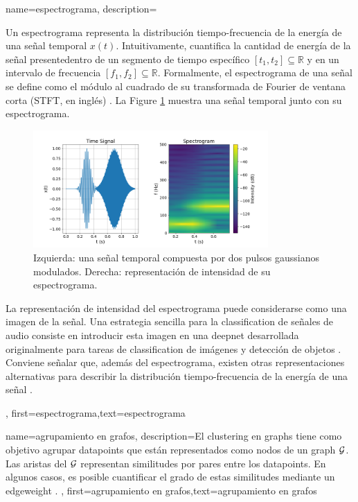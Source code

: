 {{
{name={espectrograma},
	description={
		Un espectrograma representa la distribución tiempo-frecuencia de la energía de una señal temporal $x(t)$.  
		Intuitivamente, cuantifica la cantidad de energía de la señal presentedentro de un segmento de tiempo específico 
		$[t_{1},t_{2}] \subseteq \mathbb{R}$ y en un intervalo de frecuencia $[f_{1},f_{2}]\subseteq \mathbb{R}$. 
		Formalmente, el espectrograma de una señal se define como el módulo al cuadrado de su transformada
		de Fourier de ventana corta (STFT, en inglés) \cite{cohen1995time}.
        La Figure \ref{fig:spectrogram_dict} muestra una señal temporal junto con su espectrograma. 
	\begin{figure}[H]
		\centering
		\includegraphics[width=0.8\textwidth]{assets/spectrogram.png}
		\caption{Izquierda: una señal temporal compuesta por dos pulsos gaussianos modulados. Derecha: representación de intensidad de su espectrograma.
		\label{fig:spectrogram_dict}}
	\end{figure}
		La representación de intensidad del espectrograma puede considerarse como una imagen de la señal. 
		Una estrategia sencilla para la \gls{classification} de señales de audio consiste en introducir esta imagen en una 
		\gls{deepnet} desarrollada originalmente para tareas de \gls{classification} de imágenes y detección de objetos \cite{Li:2022aa}. 
		Conviene señalar que, además del espectrograma, existen otras representaciones alternativas para describir la distribución 
		tiempo-frecuencia de la energía de una señal \cite{TimeFrequencyAnalysisBoashash,MallatBook}. 
		}, 
	first={espectrograma},text={espectrograma} 
}

{name={agrupamiento en grafos},
	description={El \gls{clustering} en \gls{graph}s tiene como objetivo agrupar \gls{datapoint}s que están representados como nodos de un \gls{graph} $\mathcal{G}$.
		Las aristas del $\mathcal{G}$ representan similitudes por pares entre los \gls{datapoint}s. 
		En algunos casos, es posible cuantificar el grado de estas similitudes mediante un \gls{edgeweight} \cite{Luxburg2007,FlowSpecClustering2021}. 
		}, 
	first={agrupamiento en grafos},text={agrupamiento en grafos} 
}

}}
